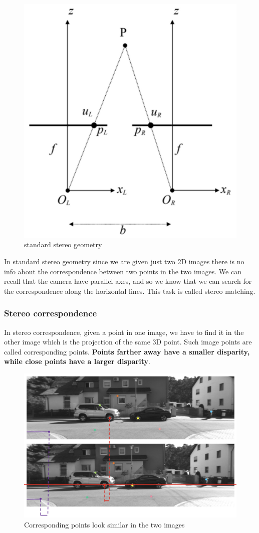 \begin{figure}[htbp]
  \centering
  \includegraphics[width=0.45\linewidth]{./img/standard_stereo_geometry.jpg}
  \caption{standard stereo geometry}
  \label{fig:standard_stereo_geometry}
\end{figure}


In standard stereo geometry since we are given just two 2D images there is no info about the correspondence between two points in the two images.
We can recall that the camera have parallel axes, and so we know that we can search for the correspondence along the horizontal lines.
This task is called stereo matching.

\subsubsection{Stereo correspondence}
In stereo correspondence, given a point in one image, we have to find it in the other image which is the projection of the same 3D point.
Such image points are called corresponding points.
\textbf{Points farther away have a smaller disparity, while close points have a larger disparity}.

\begin{figure}[htbp]
  \centering
  \includegraphics[width=0.65\linewidth]{./img/stereo_correspondence.jpg}
  \caption{Corresponding points look similar in the two images}
  \label{fig:stereo_correspondence}
\end{figure}

